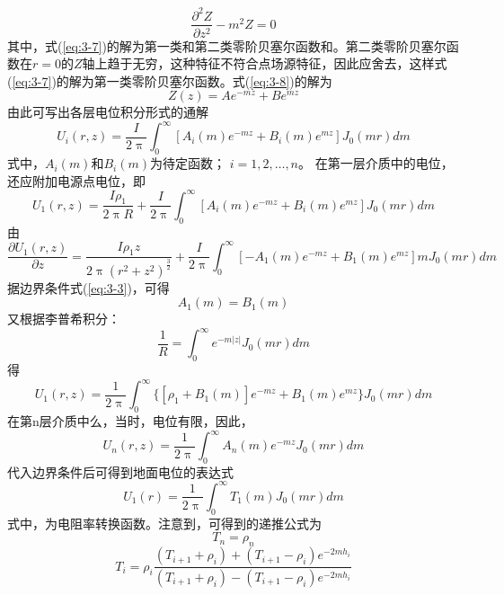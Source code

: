\documentclass[hyperref,UTF-8,twoside]{ctexart}
\newcommand*\abs[1]{\lvert#1\rvert}
\numberwithin{equation}{section}
\begin{document}
\begin{equation}
\frac{\partial^2{Z}}{\partial{z^2}}-m^2Z=0\label{eq:3-8}
\end{equation}
其中，式(\ref{eq:3-7})的解为第一类和第二类零阶贝塞尔函数和。第二类零阶贝塞尔函数在$r=0$的$Z$轴上趋于无穷，这种特征不符合点场源特征，因此应舍去，这样式(\ref{eq:3-7})的解为第一类零阶贝塞尔函数。式(\ref{eq:3-8})的解为
\begin{equation}
Z(z)=Ae^{-mz}+Be^{mz}\label{eq:3-9}
\end{equation}
由此可写出各层电位积分形式的通解
\begin{equation}
U_{i}(r,z)=\frac{I}{2\uppi}\int_0^\infty[A_i(m)e^{-mz}+B_i(m)e^{mz}]J_0(mr)dm\label{eq:3-10}
\end{equation}
式中，$ A_i(m)$和$B_i(m)$为待定函数； $i=1,2,\ldots,n$。
在第一层介质中的电位，还应附加电源点电位，即
\begin{equation}
U_{1}(r,z)=\frac{I\rho_1}{2\uppi{R}}+\frac{I}{2\uppi}\int_0^\infty[A_i(m)e^{-mz}+B_i(m)e^{mz}]J_0(mr)dm\label{eq:3-11}
\end{equation}
由
\begin{equation}
\frac{\partial U_1(r,z)}{\partial z}=\frac{I\rho_{1}z}{2\uppi(r^2+z^2)^\frac{3}{2}}+\frac{I}{2\uppi}\int_0^\infty[-A_1(m)e^{-mz}+B_1(m)e^{mz}]mJ_0(mr)dm
\end{equation}
据边界条件式(\ref{eq:3-3})，可得
\begin{equation}
A_1(m)=B_1(m)
\end{equation}
又根据李普希积分：
\begin{equation}
\frac{1}{R}=\int_0^\infty e^{-m\abs{z}}J_0(mr)dm\label{eq:3-12}
\end{equation}
得
\begin{equation}
U_1(r,z)=\frac{1}{2\uppi}\int_0^\infty\{[\rho_1+B_1(m)]e^{-mz}+B_1(m)e^{mz}\}J_0(mr)dm\label{eq:3-13}
\end{equation}
在第n层介质中么，当时，电位有限，因此，
\begin{equation}
U_n(r,z)=\frac{1}{2\uppi}\int_0^\infty A_n(m)e^{-mz}J_0(mr)dm\label{eq:3-14}
\end{equation}
代入边界条件后可得到地面电位的表达式
\begin{equation}
U_1(r)=\frac{1}{2\uppi}\int_0^\infty T_1(m)J_0(mr)dm\label{eq:3-15}
\end{equation}
式中，为电阻率转换函数。注意到，可得到的递推公式为 
\begin{equation}
T_n=\rho_n
\end{equation}
\begin{equation}
T_i=\rho_i{\frac{(T_{i+1}+\rho_i)+(T_{i+1}-\rho_i)e^{-2mh_i}}{(T_{i+1}+\rho_i)-(T_{i+1}-\rho_i)e^{-2mh_i}}}\label{eq:3-16}
\end{equation}
\end{document}

